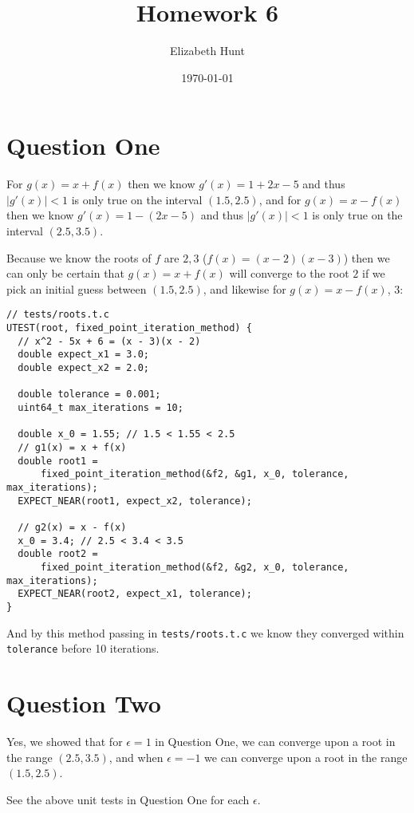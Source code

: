 \documentclass[11pt]{article}
\author{Elizabeth Hunt}
\date{\today}
\title{Homework 6}
\begin{document}
\maketitle
\setlength\parindent{0pt}
\section{Question One}
\label{sec:org206b859}

For \(g(x) = x + f(x)\) then we know \(g'(x) = 1 + 2x - 5\) and thus \(|g'(x)| \lt 1\) is only true
on the interval \((1.5, 2.5)\), and for \(g(x) = x - f(x)\) then we know \(g'(x) = 1 - (2x - 5)\)
and thus \(|g'(x)| < 1\) is only true on the interval \((2.5, 3.5)\).

Because we know the roots of \(f\) are \(2, 3\) (\(f(x) = (x-2)(x-3)\)) then we can only be
certain that \(g(x) = x + f(x)\) will converge to the root \(2\) if we pick an initial
guess between \((1.5, 2.5)\), and likewise for \(g(x) = x - f(x)\), \(3\):

\begin{verbatim}
// tests/roots.t.c
UTEST(root, fixed_point_iteration_method) {
  // x^2 - 5x + 6 = (x - 3)(x - 2)
  double expect_x1 = 3.0;
  double expect_x2 = 2.0;

  double tolerance = 0.001;
  uint64_t max_iterations = 10;

  double x_0 = 1.55; // 1.5 < 1.55 < 2.5
  // g1(x) = x + f(x)
  double root1 =
      fixed_point_iteration_method(&f2, &g1, x_0, tolerance, max_iterations);
  EXPECT_NEAR(root1, expect_x2, tolerance);

  // g2(x) = x - f(x)
  x_0 = 3.4; // 2.5 < 3.4 < 3.5
  double root2 =
      fixed_point_iteration_method(&f2, &g2, x_0, tolerance, max_iterations);
  EXPECT_NEAR(root2, expect_x1, tolerance);
}
\end{verbatim}

And by this method passing in \texttt{tests/roots.t.c} we know they converged within \texttt{tolerance} before
10 iterations.
\section{Question Two}
\label{sec:orga0f5b42}

Yes, we showed that for \(\epsilon = 1\) in Question One, we can converge upon a root in the range \((2.5, 3.5)\), and
when \(\epsilon = -1\) we can converge upon a root in the range \((1.5, 2.5)\).

See the above unit tests in Question One for each \(\epsilon\).
\end{document}

